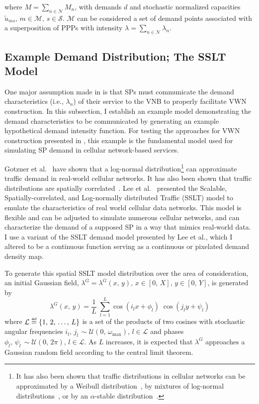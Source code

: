 \documentclass[12pt,dvipsnames]{report}
\newcommand\defeq{\mathrel{\overset{\makebox[0pt]{\mbox{\normalfont\tiny\sffamily def}}}{=}}}
\begin{document}
\noindent where $M = \sum_{n \in \mathcal{N}} M_n$, with demands $d$ and stochastic normalized capacities $\tilde{u}_{ms},\, m \in \mathcal{M},\, s \in \mathcal{S}$.  $\mathcal{M}$ can be considered a set of demand points associated with a superposition of PPPs with intensity $\lambda = \sum_{n \in \mathcal{N}} \lambda_n$.

\subsection{Example Demand Distribution; The SSLT Model} \label{subsec:networkdefs_sslt}

One major assumption made in  is that SPs must communicate the demand characteristics (i.e., $\lambda_n$) of their service to the VNB to properly facilitate VWN construction.  In this subsection, I establish an example model demonstrating the demand characteristics to be communicated by generating an example hypothetical demand intensity function.  For testing the approaches for VWN construction presented in , this example is the fundamental model used for simulating SP demand in cellular network-based services.

Gotzner et al.~\cite{686105} have shown that a log-normal distribution\footnote{It has also been shown that traffic distributions in cellular networks can be approximated by a Weibull distribution~\cite{6757900}, by mixtures of log-normal distributions~\cite{5936263, 6757900}, or by an $\alpha$-stable distribution~\cite{7202841}.} can approximate traffic demand in real-world cellular networks.  It has also been shown that traffic distributions are spatially correlated~\cite{5936263, eigenplaces}.  Lee et al.~\cite{6554749, 6757900} presented the Scalable, Spatially-correlated, and Log-normally distributed Traffic (SSLT) model to emulate the characteristics of real world cellular data networks.  This model is flexible and can be adjusted to simulate numerous cellular networks, and can characterize the demand of a supposed SP in a way that mimics real-world data.  I use a variant of the SSLT demand model presented by Lee et al., which I altered to be a continuous function serving as a continuous or pixelated demand density map.

To generate this spatial SSLT model distribution over the area of consideration, an initial Gaussian field, $\lambda^G = \lambda^G\left( x,\, y \right),\, x \in \left[ 0,\, X \right],\, y \in \left[ 0,\, Y \right]$, is generated by
\begin{equation} \label{eq:lambdaG}
\lambda^G\left( x,\, y \right) = \frac{1}{L} \; \sum_{l=1}^L \cos\left( i_l x + \phi_l \right) \; \cos\left( j_l y + \psi_l \right)
\end{equation}
where $\mathcal{L} \defeq \left\{ 1,\, 2,\, \ldots,\, L \right\}$ is a set of the products of two cosines with stochastic angular frequencies $i_l,\, j_l\, \sim \mathcal{U}\left( 0,\, \omega_{\max} \right),\, l \in \mathcal{L}$ and phases $\phi_l,\, \psi_l\, \sim \mathcal{U}\left( 0,\, 2 \pi \right),\, l \in \mathcal{L}$.  As $L$ increases, it is expected that $\lambda^G$ approaches a Gaussian random field according to the central limit theorem.
\end{document}
